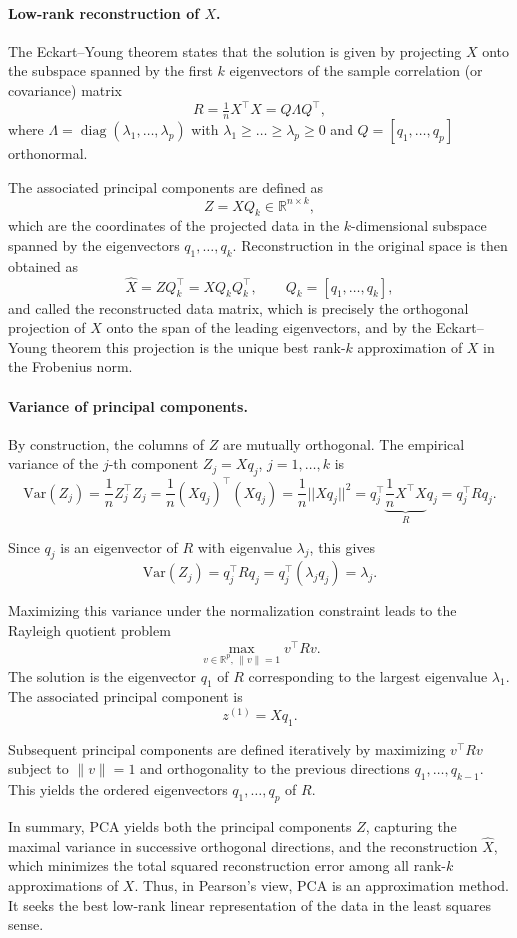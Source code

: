 \paragraph{Low-rank reconstruction of $X$.} 

The Eckart–Young theorem states that the solution is given by projecting $X$ onto the subspace spanned by the first $k$ eigenvectors of the sample correlation (or covariance) matrix
\[
R = \tfrac{1}{n} X^\top X = Q \Lambda Q^\top,
\]
where $\Lambda = \operatorname{diag}(\lambda_1, \dots, \lambda_p)$ with $\lambda_1 \ge \dots \ge \lambda_p \ge 0$ 
and $Q = [q_1,\dots,q_p]$ orthonormal.

The associated principal components are defined as
\[
Z = X Q_k \in \mathbb{R}^{n \times k},
\]
which are the coordinates of the projected data in the $k$-dimensional subspace spanned by the eigenvectors $q_1, \dots, q_k$. Reconstruction in the original space is then obtained as
\[
\widehat{X} = Z Q_k^\top = X Q_k Q_k^\top, \qquad Q_k = [q_1,\dots,q_k],
\]
and called the reconstructed data matrix, which is precisely the orthogonal projection of $X$ onto the span of the leading eigenvectors, and by the Eckart–Young theorem this projection is the unique best rank-$k$ approximation of $X$ in the Frobenius norm.

\paragraph{Variance of principal components.} 
By construction, the columns of $Z$ are mutually orthogonal. The empirical variance of the $j$-th component $Z_j = X q_j$, $j = 1, \dots, k$ is
\[
\mathrm{Var}(Z_j) = \frac{1}{n} Z_j^\top Z_j = \frac{1}{n} (X q_j)^\top (X q_j) = \frac{1}{n} ||X q_j||^2 = q_j^\top \underbrace{\frac{1}{n} X^\top X}_{R} q_j = q_j^\top R q_j.
\]

Since $q_j$ is an eigenvector of $R$ with eigenvalue $\lambda_j$, this gives
\[
\mathrm{Var}(Z_j) = q_j^\top R q_j = q_j^\top (\lambda_j q_j) = \lambda_j.
\]

Maximizing this variance under the normalization constraint leads to the Rayleigh quotient problem
\[
\max_{v \in \mathbb{R}^p, \, \|v\|=1} v^\top R v.
\]
The solution is the eigenvector $q_1$ of $R$ corresponding to the largest eigenvalue $\lambda_1$. 
The associated principal component is
\[
z^{(1)} = X q_1.
\]

Subsequent principal components are defined iteratively by maximizing $v^\top R v$ 
subject to $\|v\|=1$ and orthogonality to the previous directions $q_1, \dots, q_{k-1}$. 
This yields the ordered eigenvectors $q_1, \dots, q_p$ of $R$.

In summary, PCA yields both the principal components $Z$, capturing the maximal variance in successive orthogonal directions, 
and the reconstruction $\widehat{X}$, which minimizes the total squared reconstruction error among all rank-$k$ approximations of $X$. Thus, in Pearson’s view, PCA is an approximation method. It seeks the best low-rank linear representation of the data in the least squares sense. 